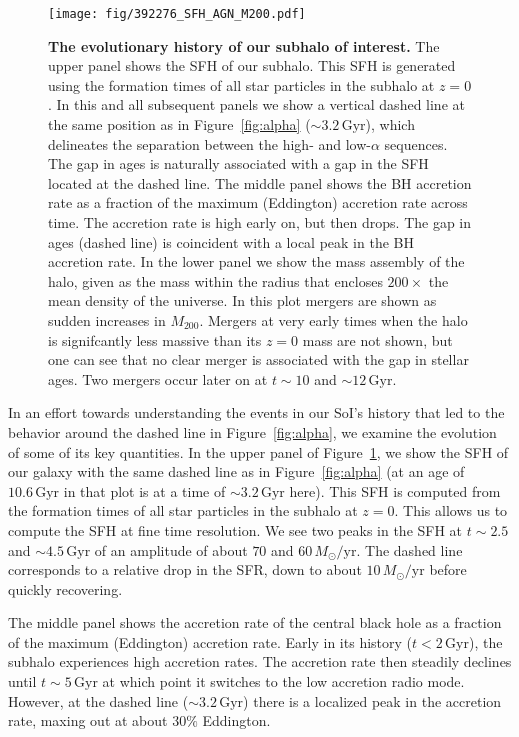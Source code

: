 \documentclass[linenumbers, twocolumn]{aastex631}
\newcommand{\Msun}{\ensuremath{M_{\odot}}}
\newcommand{\Gyr}{\ensuremath{\textrm{Gyr}}}
\newcommand{\Msunyr}{\ensuremath{\Msun/\textrm{yr}}}
\begin{document}
\begin{figure}
  \centering
  \texttt{[image: fig/392276\_SFH\_AGN\_M200.pdf]}
  \caption{\textbf{The evolutionary history of our subhalo of interest.} The upper panel shows the SFH of our subhalo. This SFH is generated using the formation times of all star particles in the subhalo at $z=0$. In this and all subsequent panels we show a vertical dashed line at the same position as in Figure~\ref{fig:alpha} ($\sim3.2\,\Gyr$), which delineates the separation between the high- and low-$\alpha$ sequences. The gap in ages is naturally associated with a gap in the SFH located at the dashed line. The middle panel shows the BH accretion rate as a fraction of the maximum (Eddington) accretion rate across time. The accretion rate is high early on, but then drops. The gap in ages (dashed line) is coincident with a local peak in the BH accretion rate. In the lower panel we show the mass assembly of the halo, given as the mass within the radius that encloses $200\times$ the mean density of the universe. In this plot mergers are shown as sudden increases in $M_{200}$. Mergers at very early times when the halo is signifcantly less massive than its $z=0$ mass are not shown, but one can see that no clear merger is associated with the gap in stellar ages. Two mergers occur later on at $t\sim10$ and $\sim12\,\Gyr$.}
  \label{fig:history}
\end{figure}

In an effort towards understanding the events in our SoI's history that led to the behavior around the dashed line in Figure~\ref{fig:alpha}, we examine the evolution of some of its key quantities. In the upper panel of Figure~\ref{fig:history}, we show the SFH of our galaxy with the same dashed line as in Figure~\ref{fig:alpha} (at an age of $10.6\,\Gyr$ in that plot is at a time of $\sim3.2\,\Gyr$ here). This SFH is computed from the formation times of all star particles in the subhalo at $z=0$. This allows us to compute the SFH at fine time resolution. We see two peaks in the SFH at $t\sim2.5$ and $\sim4.5\,\Gyr$ of an amplitude of about $70$ and $60\,\Msunyr$. The dashed line corresponds to a relative drop in the SFR, down to about $10\,\Msunyr$ before quickly recovering.

The middle panel shows the accretion rate of the central black hole as a fraction of the maximum (Eddington) accretion rate. Early in its history ($t<2\,\Gyr$), the subhalo experiences high accretion rates. The accretion rate then steadily declines until $t\sim5\,\Gyr$ at which point it switches to the low accretion radio mode. However, at the dashed line ($\sim3.2\,\Gyr$) there is a localized peak in the accretion rate, maxing out at about $30\%$ Eddington.
\end{document}
